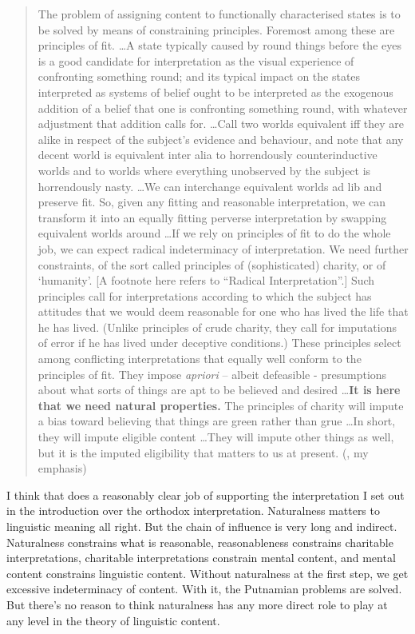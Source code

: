 \documentclass[
  11pt,
  letterpaper,
  DIV=11,
  numbers=noendperiod,
  twoside]{scrartcl}
\begin{document}
\begin{quote}
The problem of assigning content to functionally characterised states is
to be solved by means of constraining principles. Foremost among these
are principles of fit. \ldots A state typically caused by round things
before the eyes is a good candidate for interpretation as the visual
experience of confronting something round; and its typical impact on the
states interpreted as systems of belief ought to be interpreted as the
exogenous addition of a belief that one is confronting something round,
with whatever adjustment that addition calls for. \ldots Call two worlds
equivalent iff they are alike in respect of the subject's evidence and
behaviour, and note that any decent world is equivalent inter alia to
horrendously counterinductive worlds and to worlds where everything
unobserved by the subject is horrendously nasty. \ldots We can
interchange equivalent worlds ad lib and preserve fit. So, given any
fitting and reasonable interpretation, we can transform it into an
equally fitting perverse interpretation by swapping equivalent worlds
around \ldots If we rely on principles of fit to do the whole job, we
can expect radical indeterminacy of interpretation. We need further
constraints, of the sort called principles of (sophisticated) charity,
or of `humanity'. {[}A footnote here refers to ``Radical
Interpretation''.{]} Such principles call for interpretations according
to which the subject has attitudes that we would deem reasonable for one
who has lived the life that he has lived. (Unlike principles of crude
charity, they call for imputations of error if he has lived under
deceptive conditions.) These principles select among conflicting
interpretations that equally well conform to the principles of fit. They
impose \emph{apriori} -- albeit defeasible - presumptions about what
sorts of things are apt to be believed and desired \ldots{}\textbf{It is
here that we need natural properties.} The principles of charity will
impute a bias toward believing that things are green rather than grue
\ldots In short, they will impute eligible content \ldots They will
impute other things as well, but it is the imputed eligibility that
matters to us at present. (, my emphasis)
\end{quote}

I think that does a reasonably clear job of supporting the
interpretation I set out in the introduction over the orthodox
interpretation. Naturalness matters to linguistic meaning all right. But
the chain of influence is very long and indirect. Naturalness constrains
what is reasonable, reasonableness constrains charitable
interpretations, charitable interpretations constrain mental content,
and mental content constrains linguistic content. Without naturalness at
the first step, we get excessive indeterminacy of content. With it, the
Putnamian problems are solved. But there's no reason to think
naturalness has any more direct role to play at any level in the theory
of linguistic content.
\end{document}
